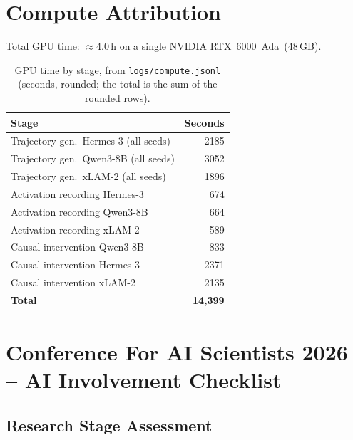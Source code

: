 \documentclass{article}
\begin{document}
\section{Compute Attribution}
\label{app:compute}

Total GPU time: $\approx$4.0\,h on a single NVIDIA RTX~6000~Ada~(48\,GB).

\begin{table}[h]
\caption{GPU time by stage, from \texttt{logs/compute.jsonl} (seconds,
rounded; the total is the sum of the rounded rows).}
\centering\small
\begin{tabular}{lr}
\toprule
Stage & Seconds \\
\midrule
Trajectory gen.\ Hermes-3 (all seeds) & 2185 \\
Trajectory gen.\ Qwen3-8B (all seeds) & 3052 \\
Trajectory gen.\ xLAM-2 (all seeds) & 1896 \\
Activation recording Hermes-3 & 674 \\
Activation recording Qwen3-8B & 664 \\
Activation recording xLAM-2 & 589 \\
Causal intervention Qwen3-8B & 833 \\
Causal intervention Hermes-3 & 2371 \\
Causal intervention xLAM-2 & 2135 \\
\midrule
\textbf{Total} & \textbf{14,399} \\
\bottomrule
\end{tabular}
\end{table}

\newpage
\section*{Conference For AI Scientists 2026 -- AI Involvement Checklist}
\label{checklist_ai_involvement}

\subsection*{Research Stage Assessment}
\end{document}
